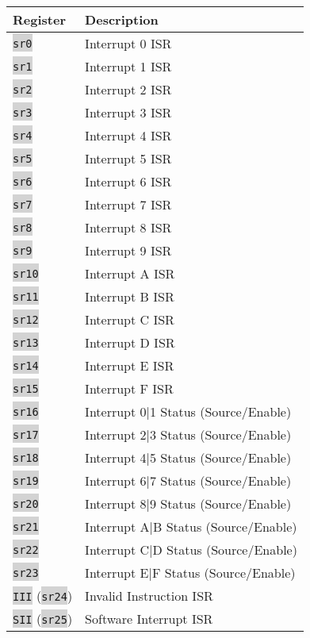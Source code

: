 \documentclass{article}
\newcommand{\labcode}[1]{\colorbox{lightgray}{\lstinline[language=lab]{#1}}}
\begin{document}
\begin{table}[h!]
\centering
\begin{tabular}{ll}
    \toprule Register & Description \\ \midrule
    \labcode{sr0} & Interrupt 0 ISR \\
    \labcode{sr1} & Interrupt 1 ISR \\
    \labcode{sr2} & Interrupt 2 ISR \\
    \labcode{sr3} & Interrupt 3 ISR \\
    \labcode{sr4} & Interrupt 4 ISR \\
    \labcode{sr5} & Interrupt 5 ISR \\
    \labcode{sr6} & Interrupt 6 ISR \\
    \labcode{sr7} & Interrupt 7 ISR \\
    \labcode{sr8} & Interrupt 8 ISR \\
    \labcode{sr9} & Interrupt 9 ISR \\
    \labcode{sr10} & Interrupt A ISR \\
    \labcode{sr11} & Interrupt B ISR \\
    \labcode{sr12} & Interrupt C ISR \\
    \labcode{sr13} & Interrupt D ISR \\
    \labcode{sr14} & Interrupt E ISR \\
    \labcode{sr15} & Interrupt F ISR \\
    \labcode{sr16} & Interrupt 0|1 Status (Source/Enable) \\
    \labcode{sr17} & Interrupt 2|3 Status (Source/Enable) \\
    \labcode{sr18} & Interrupt 4|5 Status (Source/Enable) \\
    \labcode{sr19} & Interrupt 6|7 Status (Source/Enable) \\
    \labcode{sr20} & Interrupt 8|9 Status (Source/Enable) \\
    \labcode{sr21} & Interrupt A|B Status (Source/Enable) \\
    \labcode{sr22} & Interrupt C|D Status (Source/Enable) \\
    \labcode{sr23} & Interrupt E|F Status (Source/Enable) \\
    \labcode{III} (\labcode{sr24}) & Invalid Instruction ISR \\
    \labcode{SII} (\labcode{sr25}) & Software Interrupt ISR \\

\end{tabular}
\end{table}
\end{document}
